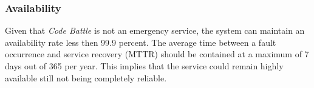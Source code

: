 \subsubsection{Availability}
Given that \textit{Code Battle} is not an emergency service, the system can maintain an availability rate less then 99.9 percent. The average time between a fault occurrence and service recovery (MTTR) should be contained at a maximum of 7 days out of 365 per year. This implies that the service could remain highly available still not being completely reliable.


